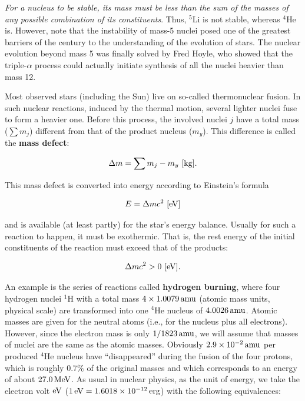 \documentclass[a4paper,10pt]{article}
\begin{document}
{\noindent}\textit{For a nucleus to be stable, its mass must be less than the sum of the masses of any possible combination of its constituents}. Thus, $^5$Li is not stable, whereas $^4$He is. However, note that the instability of mass-5 nuclei posed one of the greatest barriers of the century to the understanding of the evolution of stars. The nuclear evolution beyond mass 5 was finally solved by Fred Hoyle, who showed that the triple-$\alpha$ process could actually initiate synthesis of all the nuclei heavier than mass 12.

{\noindent}Most observed stars (including the Sun) live on so-called thermonuclear fusion. In such nuclear reactions, induced by the thermal motion, several lighter nuclei fuse to form a heavier one. Before this process, the involved nuclei $j$ have a total mass ($\sum m_j$) different from that of the product nucleus ($m_y$). This difference is called the \textbf{mass defect}:

\begin{align*}
    \Delta m = \sum m_j - m_y ~ [{\rm kg}].
\end{align*}

{\noindent}This mass defect is converted into energy according to Einstein's formula

\begin{align*}
    E = \Delta m c^2 ~ [{\rm eV}]
\end{align*}

{\noindent}and is available (at least partly) for the star's energy balance. Usually for such a reaction to happen, it must be exothermic. That is, the rest energy of the initial constituents of the reaction must exceed that of the products:

\begin{align*}
    \Delta mc^2>0 ~ [{\rm eV}].
\end{align*}

{\noindent}An example is the series of reactions called \textbf{hydrogen burning}, where four hydrogen nuclei $^1$H with a total mass $4\times1.0079\,{\rm amu}$ (atomic mass units, physical scale) are transformed into one $^4$He nucleus of $4.0026\,{\rm amu}$. Atomic masses are given for the neutral atoms (i.e., for the nucleus plus all electrons). However, since the electron mass is only $1/1823\,{\rm amu}$, we will assume that masses of nuclei are the same as the atomic masses. Obviously $2.9\times10^{-2}\,{\rm amu}$ per produced $^4$He nucleus have ``disappeared'' during the fusion of the four protons, which is roughly $0.7\%$ of the original masses and which corresponds to an energy of about $27.0\,{\rm MeV}$. As usual in nuclear physics, as the unit of energy, we take the electron volt ${\rm eV}$ ($1\,{\rm eV}=1.6018\times10^{-12}\,{\rm erg}$) with the following equivalences:
\end{document}
